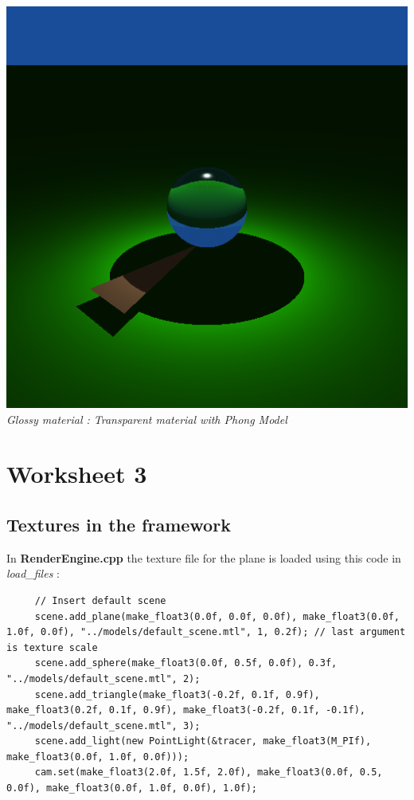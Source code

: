 \documentclass[a4,12pt]{article}
\begin{document}
\begin{center}
\begin{minipage}[b]{0.40\linewidth}
\begin{center}
				\includegraphics[width =\textwidth]{./Worksheet2/glossy_cor.png}\\
				\textit{Glossy material : Transparent material with Phong Model}
			\end{center}
		\end{minipage}
	\end{center}
	\section{Worksheet 3}
	\subsection{Textures in the framework}
	In \textbf{RenderEngine.cpp} the texture file for the plane is loaded using this code in \textit{load\_files} : 
	\begin{lstlisting}
	 // Insert default scene
	 scene.add_plane(make_float3(0.0f, 0.0f, 0.0f), make_float3(0.0f, 1.0f, 0.0f), "../models/default_scene.mtl", 1, 0.2f); // last argument is texture scale
	 scene.add_sphere(make_float3(0.0f, 0.5f, 0.0f), 0.3f, "../models/default_scene.mtl", 2);
	 scene.add_triangle(make_float3(-0.2f, 0.1f, 0.9f), make_float3(0.2f, 0.1f, 0.9f), make_float3(-0.2f, 0.1f, -0.1f), "../models/default_scene.mtl", 3);
	 scene.add_light(new PointLight(&tracer, make_float3(M_PIf), make_float3(0.0f, 1.0f, 0.0f)));
	 cam.set(make_float3(2.0f, 1.5f, 2.0f), make_float3(0.0f, 0.5, 0.0f), make_float3(0.0f, 1.0f, 0.0f), 1.0f);
	\end{lstlisting}
	
\end{document}
